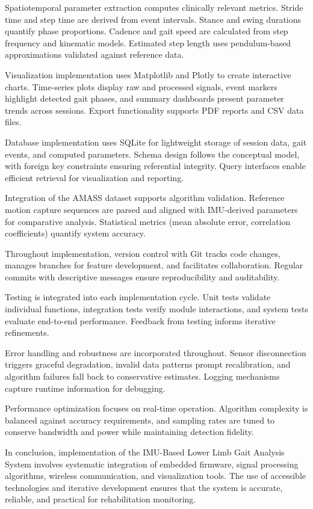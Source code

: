 \documentclass[12pt,a4paper]{report}
\begin{document}
Spatiotemporal parameter extraction computes clinically relevant metrics. Stride time and step time are derived from event intervals. Stance and swing durations quantify phase proportions. Cadence and gait speed are calculated from step frequency and kinematic models. Estimated step length uses pendulum-based approximations validated against reference data.

Visualization implementation uses Matplotlib and Plotly to create interactive charts. Time-series plots display raw and processed signals, event markers highlight detected gait phases, and summary dashboards present parameter trends across sessions. Export functionality supports PDF reports and CSV data files.

Database implementation uses SQLite for lightweight storage of session data, gait events, and computed parameters. Schema design follows the conceptual model, with foreign key constraints ensuring referential integrity. Query interfaces enable efficient retrieval for visualization and reporting.

Integration of the AMASS dataset supports algorithm validation. Reference motion capture sequences are parsed and aligned with IMU-derived parameters for comparative analysis. Statistical metrics (mean absolute error, correlation coefficients) quantify system accuracy.

Throughout implementation, version control with Git tracks code changes, manages branches for feature development, and facilitates collaboration. Regular commits with descriptive messages ensure reproducibility and auditability.

Testing is integrated into each implementation cycle. Unit tests validate individual functions, integration tests verify module interactions, and system tests evaluate end-to-end performance. Feedback from testing informs iterative refinements.

Error handling and robustness are incorporated throughout. Sensor disconnection triggers graceful degradation, invalid data patterns prompt recalibration, and algorithm failures fall back to conservative estimates. Logging mechanisms capture runtime information for debugging.

Performance optimization focuses on real-time operation. Algorithm complexity is balanced against accuracy requirements, and sampling rates are tuned to conserve bandwidth and power while maintaining detection fidelity.

In conclusion, implementation of the IMU-Based Lower Limb Gait Analysis System involves systematic integration of embedded firmware, signal processing algorithms, wireless communication, and visualization tools. The use of accessible technologies and iterative development ensures that the system is accurate, reliable, and practical for rehabilitation monitoring.
\end{document}
